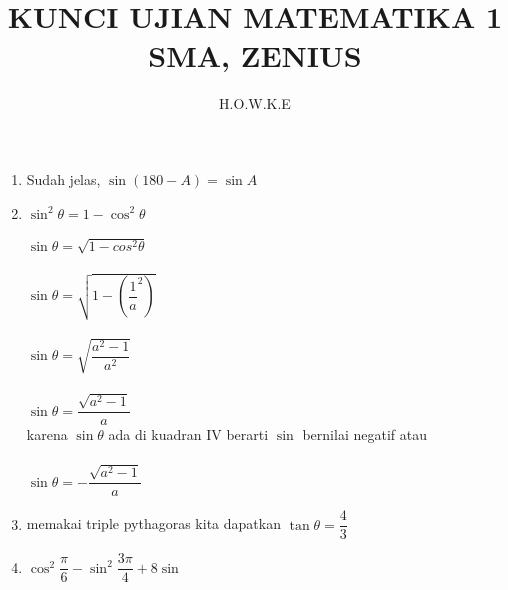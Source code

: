\documentclass[12pt,a4paper]{article}
\author{H.O.W.K.E}
\title{KUNCI UJIAN MATEMATIKA 1 SMA, ZENIUS}
\begin{document}
	\maketitle
	\begin{enumerate}
		\item Sudah jelas, $\sin(180-A)=\sin A$
		\item $\sin^2 \theta = 1-\cos^2 \theta$\\
			  \\
			  $\sin \theta=\sqrt{1-cos^2 \theta}$\\
			  \\
			  $\sin \theta=\sqrt{1-(\dfrac{1}{a}^2)}$\\
			  \\
			  $\sin \theta=\sqrt{\dfrac{a^2-1}{a^2}}$\\
			  \\
			  $\sin \theta=\dfrac{\sqrt{a^2-1}}{a}$\\
			  
			  karena $\sin \theta$ ada di kuadran IV berarti $\sin$ bernilai negatif atau\\
			  \\
			  $\sin \theta=-\dfrac{\sqrt{a^2-1}}{a}$\\
			  \item memakai triple pythagoras kita dapatkan $\tan \theta = \dfrac{4}{3}$
			  \item $\cos^2 \dfrac{\pi}{6} - \sin^2 \dfrac{3\pi}{4} + 8\sin $
		
	\end{enumerate}
\end{document}
